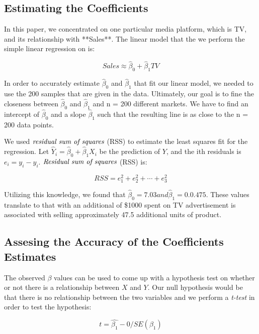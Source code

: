 \documentclass{article}
\begin{document}
\subsection{Estimating the Coefficients}

In this paper, we concentrated on one particular media platform, which is TV, and its relationship with **Sales**. The linear model that the we perform the simple linear regression on is:

\begin{equation}
Sales \approx \hat{\beta}_0 + \hat{\beta}_1 TV
\end{equation}

In order to accurately estimate $\hat{\beta}_0$ and $\hat{\beta}_1$ that fit our linear model, we needed to use the 200 samples that are given in the data. Ultimately, our goal is to fine the closeness between $\hat{\beta}_0$ and $\hat{\beta}_1$ and n = 200 different markets. We have to find an intercept of $\hat{\beta}_0$ and a slope $\hat{\beta}_1$ such that the resulting line is as close to the n = 200 data points. 

We used $\emph{residual sum of squares}$ (RSS) to estimate the least squares fit for the regression. Let $\hat{Y}_i = \hat{\beta}_0 + \hat{\beta}_1 X_i$ be the prediction of $Y$, and the ith residuals is $e_i = y_i - y_i$. $\emph{Residual sum of squares}$ (RSS) is:

\begin{equation}
RSS = e_1^2 + e_2^2 + \cdots + e_3^2
\end{equation}

Utilizing this knowledge, we found that $\hat{\beta}_0 = 7.03 and \hat{\beta}_1 = 0.0.475$. These values translate to that with an additional of \$1000 spent on TV advertisement is associated with selling approximately 47.5 additional units of product. 

\subsection{Assesing the Accuracy of the Coefficients Estimates}

The observed $\beta$ values can be used to come up with a hypothesis test on whether or not there is a relationship between $X$ and $Y$. Our null hypothesis would be that there is no relationship between the two variables and we perform a \emph{t-test} in order to test the hypothesis:

\begin{equation}
t = \hat{\beta_1} - 0 / SE(\beta_1)
\end{equation}
\end{document}

